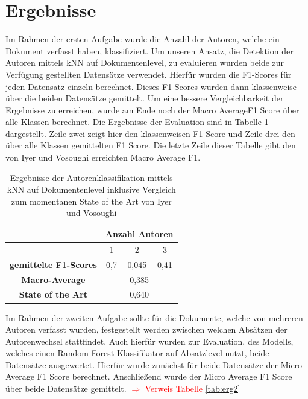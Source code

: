 \documentclass[conference]{IEEEtran}
\begin{document}
\section{Ergebnisse}
	Im Rahmen der ersten Aufgabe wurde die Anzahl der Autoren, welche ein Dokument verfasst haben, klassifiziert. Um unseren Ansatz, die Detektion der Autoren mittels kNN auf Dokumentenlevel, zu evaluieren wurden beide zur Verfügung gestellten Datensätze verwendet. Hierfür wurden die F1-Scores für jeden Datensatz einzeln berechnet. Dieses F1-Scores wurden dann klassenweise über die beiden Datensätze gemittelt. Um eine bessere Vergleichbarkeit der Ergebnisse zu erreichen, wurde am Ende noch der Macro AverageF1 Score über alle Klassen berechnet. Die Ergebnisse der Evaluation sind in Tabelle \ref{tab:erg1} dargestellt. Zeile zwei zeigt hier den klassenweisen F1-Score und Zeile drei den über alle Klassen gemittelten F1 Score. Die letzte Zeile dieser Tabelle gibt den von Iyer und Vosoughi erreichten Macro Average F1.
	\begin{table}[htbp]
		\caption{Ergebnisse der Autorenklassifikation mittels kNN auf Dokumentenlevel inklusive Vergleich zum momentanen State of the Art von Iyer und Vosoughi}
		\begin{center}
			\begin{tabular}{|c|c|c|c|}
				\hline
				 & \multicolumn{3}{|c|}{Anzahl Autoren} \tabularnewline
				\hline
				 & 1 & 2 & 3 \\
				 \hline
				 \textbf{gemittelte F1-Scores} & 0,7 & 0,045 & 0,41 \\
				 \hline
				 \textbf{Macro-Average} & \multicolumn{3}{|c|}{0,385} \tabularnewline
				 \hline
				 \textbf{State of the Art} & \multicolumn{3}{|c|}{0,640} \tabularnewline
				 \hline
			\end{tabular}
			\label{tab:erg1}
		\end{center}
	\end{table}
	\par\bigskip
	Im Rahmen der zweiten Aufgabe sollte für die Dokumente, welche von mehreren Autoren verfasst wurden, festgestellt werden zwischen welchen Absätzen der Autorenwechsel stattfindet. Auch hierfür wurden zur Evaluation, des Modells, welches einen Random Forest Klassifikator auf Absatzlevel nutzt, beide Datensätze ausgewertet. Hierfür wurde zunächst für beide Datensätze der Micro Average F1 Score berechnet. Anschließend wurde der Micro Average F1 Score über beide Datensätze gemittelt.
	\newline
	\textcolor{red}{$\Rightarrow$ Verweis Tabelle \ref{tab:erg2}}
\end{document}
